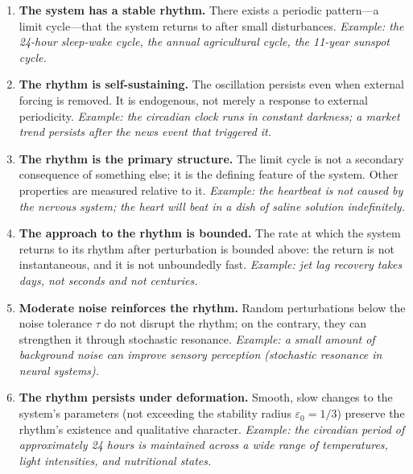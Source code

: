 \documentclass[12pt, oneside]{book}
\theoremstyle{plain}
\theoremstyle{definition}
\theoremstyle{remark}
\begin{document}
\begin{enumerate}[label=\textbf{Axiom \arabic*.}]

  \item \textbf{The system has a stable rhythm.}
    There exists a periodic pattern---a limit cycle---that
    the system returns to after small disturbances.
    \emph{Example: the 24-hour sleep-wake cycle, the annual
    agricultural cycle, the 11-year sunspot cycle.}

  \item \textbf{The rhythm is self-sustaining.}
    The oscillation persists even when external forcing is
    removed. It is endogenous, not merely a response to
    external periodicity.
    \emph{Example: the circadian clock runs in constant darkness;
    a market trend persists after the news event that triggered it.}

  \item \textbf{The rhythm is the primary structure.}
    The limit cycle is not a secondary consequence of something
    else; it is the defining feature of the system. Other
    properties are measured relative to it.
    \emph{Example: the heartbeat is not caused by the nervous
    system; the heart will beat in a dish of saline solution
    indefinitely.}

  \item \textbf{The approach to the rhythm is bounded.}
    The rate at which the system returns to its rhythm after
    perturbation is bounded above: the return is not
    instantaneous, and it is not unboundedly fast.
    \emph{Example: jet lag recovery takes days, not seconds
    and not centuries.}

  \item \textbf{Moderate noise reinforces the rhythm.}
    Random perturbations below the noise tolerance $\tau$
    do not disrupt the rhythm; on the contrary, they can
    strengthen it through stochastic resonance.
    \emph{Example: a small amount of background noise
    can improve sensory perception (stochastic resonance
    in neural systems).}

  \item \textbf{The rhythm persists under deformation.}
    Smooth, slow changes to the system's parameters
    (not exceeding the stability radius $\varepsilon_0 = 1/3$)
    preserve the rhythm's existence and qualitative character.
    \emph{Example: the circadian period of approximately
    24 hours is maintained across a wide range of temperatures,
    light intensities, and nutritional states.}


\end{enumerate}
\end{document}

